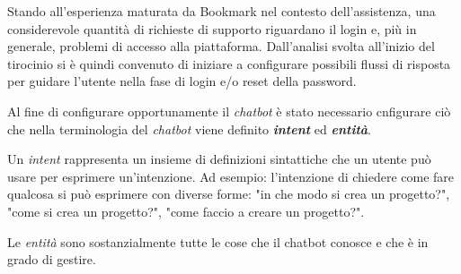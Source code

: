 Stando all'esperienza maturata da Bookmark nel contesto dell'assistenza, una considerevole quantità di richieste di supporto riguardano il login e, più in generale, problemi di accesso alla piattaforma.
%
Dall'analisi svolta all'inizio del tirocinio si è quindi convenuto di iniziare a configurare possibili flussi di risposta per guidare l'utente nella fase di login e/o reset della password. 

Al fine di configurare opportunamente il \textit{chatbot} è stato necessario cnfigurare ciò che nella terminologia del \textit{chatbot} viene definito \textbf{\textit{intent}} ed \textbf{\textit{entità}}.

Un \textit{intent} rappresenta un insieme di definizioni sintattiche che un utente può usare per esprimere un'intenzione.
%
Ad esempio: l'intenzione di chiedere come fare qualcosa si può esprimere con diverse forme: "in che modo si crea un progetto?", "come si crea un progetto?", "come faccio a creare un progetto?".

Le \textit{entità} sono sostanzialmente tutte le cose che il chatbot conosce e che è in grado di gestire. 
